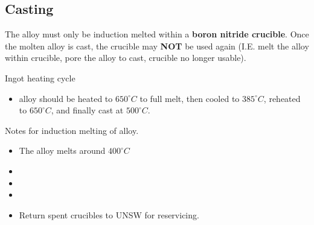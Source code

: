 \subsection{Casting}

The \MgZnCa alloy must only be induction melted within a \textbf{boron nitride crucible}. Once the molten alloy is cast, the crucible may \textbf{NOT} be used again (I.E. melt the alloy within crucible, pore the alloy to cast, crucible no longer usable). 

Ingot heating cycle
\begin{itemize}
\item \MgZnCa alloy should be heated to $650^{\circ}C$ to full melt, then cooled to $385^{\circ}C$, reheated to $650^{\circ}C$, and finally cast at $500^{\circ}C$.
\end{itemize}

Notes for induction melting of \MgZnCa alloy.
\begin{itemize}
\item The \MgZnCa alloy melts around $400^{\circ}C$
\item 
\item 
\item
\item Return spent crucibles to UNSW for reservicing. 
\end{itemize}